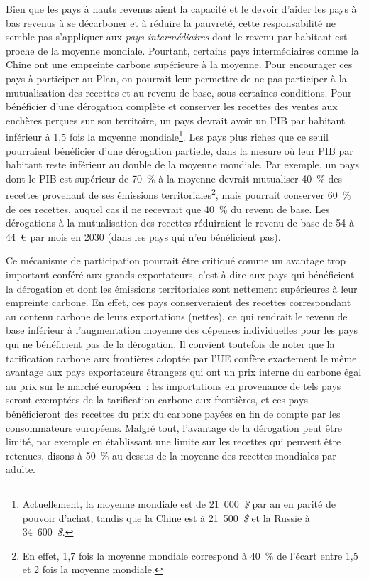 \documentclass[a5paper,french,openany]{memoir}
\begin{document}
Bien que les pays à hauts revenus aient la capacité et le devoir d'aider les pays à bas revenus à se décarboner et à réduire la pauvreté, cette responsabilité ne semble pas s'appliquer aux \textit{pays intermédiaires} dont le revenu par habitant est proche de la moyenne mondiale. Pourtant, certains pays intermédiaires comme la Chine ont une empreinte carbone supérieure à la moyenne. Pour encourager ces pays à participer au Plan, on pourrait leur permettre de ne pas participer à la mutualisation des recettes et au revenu de base, sous certaines conditions. Pour bénéficier d'une dérogation complète et conserver les recettes des ventes aux enchères perçues sur son territoire, un pays devrait avoir un PIB par habitant inférieur à 1,5 fois la moyenne mondiale\footnote{Actuellement, la moyenne mondiale est de 21~000~\textit{\$} par an en parité de pouvoir d'achat, tandis que la Chine est à 21~500~\textit{\$} et la Russie à 34~600~\textit{\$}.}. 
Les pays plus riches que ce seuil pourraient bénéficier d'une dérogation partielle, dans la mesure où leur PIB par habitant reste inférieur au double de la moyenne mondiale. Par exemple, un pays dont le PIB est supérieur de 70~\% à la moyenne devrait mutualiser 40~\% des recettes provenant de ses émissions territoriales\footnote{En effet, 1,7 fois la moyenne mondiale correspond à 40~\% de l'écart entre 1,5 et 2 fois la moyenne mondiale.}, mais pourrait conserver 60~\% de ces recettes, auquel cas il ne recevrait que 40~\% du revenu de base. Les dérogations à la mutualisation des recettes réduiraient le revenu de base de 54 à 44~\euro{} par mois en 2030 (dans les pays qui n'en bénéficient pas). 

Ce mécanisme de participation pourrait être critiqué comme un avantage trop important conféré aux grands exportateurs, c'est-à-dire aux pays qui bénéficient la dérogation et dont les émissions territoriales sont nettement supérieures à leur empreinte carbone. En effet, ces pays conserveraient des recettes correspondant au contenu carbone de leurs exportations (nettes), ce qui rendrait le revenu de base inférieur à l'augmentation moyenne des dépenses individuelles pour les pays qui ne bénéficient pas de la dérogation. Il convient toutefois de noter que la tarification carbone aux frontières adoptée par l'UE confère exactement le même avantage aux pays exportateurs étrangers qui ont un prix interne du carbone égal au prix sur le marché européen~: les importations en provenance de tels pays seront exemptées de la tarification carbone aux frontières, et ces pays bénéficieront des recettes du prix du carbone payées en fin de compte par les consommateurs européens. Malgré tout, l'avantage de la dérogation peut être limité, par exemple en établissant une limite sur les recettes qui peuvent être retenues, disons à 50~\% au-dessus de la moyenne des recettes mondiales par adulte. %
\end{document}
